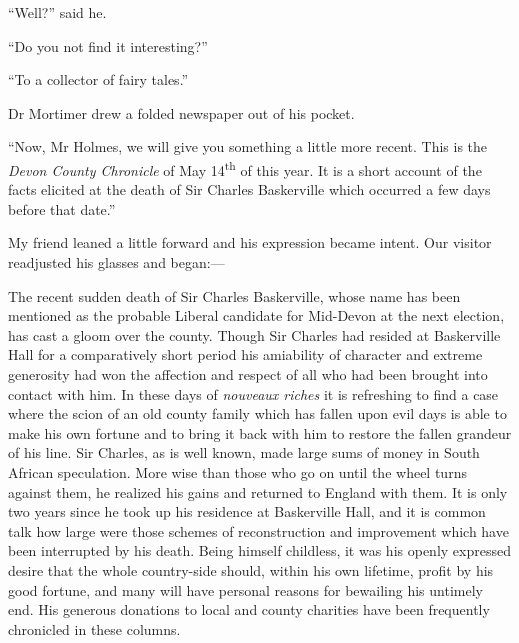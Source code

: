 \documentclass[paper=a5,BCOR=7mm,twoside,DIV=calc,12pt,usegeometry,openany,chapterprefix,endperiod,headings=big]{scrbook} %
\begin{document}
\enquote{Well?} said he.

\enquote{Do you not find it interesting?}

\enquote{To a collector of fairy tales.}

Dr Mortimer drew a folded newspaper out of his pocket.

\enquote{Now, Mr Holmes, we will give you something a little more recent. This is the \textit{Devon County Chronicle} of May 14\textsuperscript{th} of this year. It is a short account of the facts elicited at the death of Sir Charles Baskerville which occurred a few days before that date.}

My friend leaned a little forward and his expression became intent. Our visitor readjusted his glasses and began:--- \\

\vfill

\textsf{The recent sudden death of Sir Charles Baskerville, whose name has been mentioned as the probable Liberal candidate for Mid-Devon at the next election, has cast a gloom over the county. Though Sir Charles had resided at Baskerville Hall for a comparatively short period his amiability of character and extreme generosity had won the affection and respect of all who had been brought into contact with him. In these days of \emph{nouveaux riches} it is refreshing to find a case where the scion of an old county family which has fallen upon evil days is able to make his own fortune and to bring it back with him to restore the fallen grandeur of his line. Sir Charles, as is well known, made large sums of money in South African speculation. More wise than those who go on until the wheel turns against them, he realized his gains and returned to England with them. It is only two years since he took up his residence at Baskerville Hall, and it is common talk how large were those schemes of reconstruction and improvement which have been interrupted by his death. Being himself childless, it was his openly expressed desire that the whole country-side should, within his own lifetime, profit by his good fortune, and many will have personal reasons for bewailing his untimely end. His generous donations to local and county charities have been frequently chronicled in these columns.}

\end{document}
